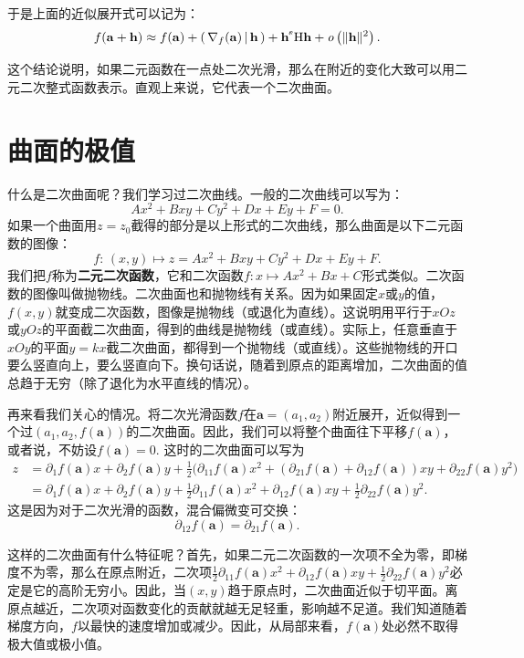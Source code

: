 \documentclass[12pt,UTF8,fontset=none]{ctexbook}
\begin{document}
于是上面的近似展开式可以记为：
\begin{align*}
    f(\mathbf{a} + \mathbf{h}) \approx f(\mathbf{a}) + \nji{\nabla_f(\mathbf{a})}{\mathbf{h}} + \mathbf{h}^{\tr} \mathrm{H} \mathbf{h} + \olim{\|\mathbf{h}\|^2}.
\end{align*}

这个结论说明，如果二元函数在一点处二次光滑，那么在附近的变化大致可以用二元二次整式函数表示。直观上来说，它代表一个二次曲面。

\section{曲面的极值}

什么是二次曲面呢？我们学习过二次曲线。一般的二次曲线可以写为：
$$ Ax^2 + Bxy + Cy^2 + Dx + Ey + F = 0.$$
如果一个曲面用$z = z_0$截得的部分是以上形式的二次曲线，那么曲面是以下二元函数的图像：
$$ f: \, (x, y) \mapsto z = Ax^2 + Bxy + Cy^2 + Dx + Ey + F. $$
我们把$f$称为\textbf{二元二次函数}，它和二次函数$f:x\mapsto Ax^2 +Bx + C$形式类似。二次函数的图像叫做抛物线。二次曲面也和抛物线有关系。因为如果固定$x$或$y$的值，$f(x,y)$就变成二次函数，图像是抛物线（或退化为直线）。这说明用平行于$xOz$或$yOz$的平面截二次曲面，得到的曲线是抛物线（或直线）。实际上，任意垂直于$xOy$的平面$y = kx$截二次曲面，都得到一个抛物线（或直线）。这些抛物线的开口要么竖直向上，要么竖直向下。换句话说，随着到原点的距离增加，二次曲面的值总趋于无穷（除了退化为水平直线的情况）。

再来看我们关心的情况。将二次光滑函数$f$在$\mathbf{a}=(a_1,a_2)$附近展开，近似得到一个过$(a_1,a_2,f(\mathbf{a}))$的二次曲面。因此，我们可以将整个曲面往下平移$f(\mathbf{a})$，或者说，不妨设$f(\mathbf{a}) = 0.$ 这时的二次曲面可以写为
\begin{align*}
    z &= \partial_1 f(\mathbf{a}) x + \partial_2 f(\mathbf{a}) y + \frac{1}{2} \bigg(\partial_{11} f(\mathbf{a})x^2 + (\partial_{21} f(\mathbf{a}) + \partial_{12} f(\mathbf{a}))xy + \partial_{22} f(\mathbf{a})y^2\bigg) \\
    &= \partial_1 f(\mathbf{a}) x + \partial_2 f(\mathbf{a}) y + \frac{1}{2} \partial_{11} f(\mathbf{a})x^2 + \partial_{12} f(\mathbf{a})xy + \frac{1}{2}\partial_{22} f(\mathbf{a})y^2.
\end{align*}
这是因为对于二次光滑的函数，混合偏微变可交换：
$$ \partial_{12} f(\mathbf{a}) = \partial_{21} f(\mathbf{a}).$$

这样的二次曲面有什么特征呢？首先，如果二元二次函数的一次项不全为零，即梯度不为零，那么在原点附近，二次项$\frac{1}{2} \partial_{11} f(\mathbf{a})x^2 + \partial_{12} f(\mathbf{a})xy + \frac{1}{2}\partial_{22} f(\mathbf{a})y^2$必定是它的高阶无穷小。因此，当$(x,y)$趋于原点时，二次曲面近似于切平面。离原点越近，二次项对函数变化的贡献就越无足轻重，影响越不足道。我们知道随着梯度方向，$f$以最快的速度增加或减少。因此，从局部来看，$f(\mathbf{a})$处必然不取得极大值或极小值。
\end{document}
